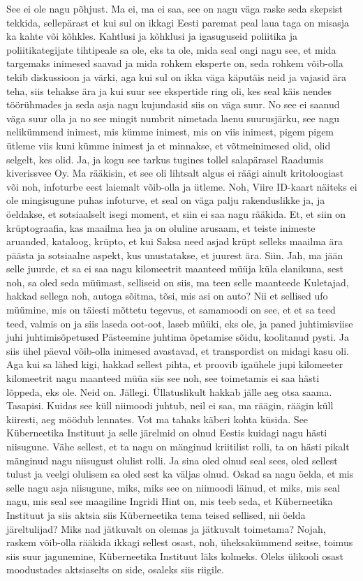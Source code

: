 See ei ole nagu põhjust. Ma ei, ma ei saa, see on nagu väga raske seda skepsist tekkida, sellepärast et kui sul on ikkagi Eesti paremat peal laua taga on misasja ka kahte või kõhkles.
Kahtlusi ja kõhklusi ja igasuguseid poliitika ja poliitikategijate tihtipeale sa ole, eks ta ole, mida seal ongi nagu see, et mida targemaks inimesed saavad ja mida rohkem eksperte on, seda rohkem võib-olla tekib diskussioon ja värki, aga kui sul on ikka väga käputäis neid ja vajasid ära teha, siis tehakse ära ja kui suur see ekspertide ring oli, kes seal käis nendes töörühmades ja seda asja nagu kujundasid siis on väga suur. No see ei saanud väga suur olla ja no see mingit numbrit nimetada laenu suurusjärku, see nagu nelikümmend inimest, mis kümme inimest, mis on viis inimest, pigem pigem ütleme viis kuni kümme inimest ja et minnakse, et võtmeinimesed olid, olid selgelt, kes olid. Ja, ja kogu see tarkus tugines tollel salapärasel Raadumis kiverissvee Oy. Ma rääkisin, et see oli lihtsalt algus ei räägi ainult kritoloogiast või noh, infoturbe eest laiemalt võib-olla ja ütleme. Noh, Viire ID-kaart näiteks ei ole mingisugune puhas infoturve, et seal on väga palju rakenduslikke ja, ja öeldakse, et sotsiaalselt isegi moment, et siin ei saa nagu rääkida. Et, et siin on krüptograafia, kas maailma hea ja on oluline arusaam, et teiste inimeste aruanded, kataloog, krüpto, et kui Saksa need asjad krüpt selleks maailma ära päästa ja sotsiaalne aspekt, kus unustatakse, et juurest ära. Siin. Jah, ma jään selle juurde, et sa ei saa nagu kilomeetrit maanteed müüja küla elanikuna, sest noh, sa oled seda müümast, selliseid on siis, ma teen selle maanteede Kuletajad, hakkad sellega noh, autoga sõitma, tõsi, mis asi on auto?
Nii et sellised ufo müümine, mis on täiesti mõttetu tegevus, et samamoodi on see, et et sa teed teed, valmis on ja siis laseda oot-oot, laseb müüki, eks ole, ja paned juhtimisviise juhi juhtimisõpetused Pästeemine juhtima õpetamise sõidu, koolitanud pysti. Ja siis ühel päeval võib-olla inimesed avastavad, et transpordist on midagi kasu oli. Aga kui sa lähed kigi, hakkad sellest pihta, et proovib igaühele jupi kilomeeter kilomeetrit nagu maanteed müüa siis see noh, see toimetamis ei saa hästi lõppeda, eks ole. Neid on.
Jällegi.
Üllatuslikult hakkab jälle aeg otsa saama. Tasapisi. Kuidas see küll niimoodi juhtub, neil ei saa, ma räägin, räägin küll kiiresti, aeg möödub lennates.
Vot ma tahaks käberi kohta küsida. See Küberneetika Instituut ja selle järelmid on olnud Eestis kuidagi nagu hästi niisugune. Vähe sellest, et ta nagu on mänginud kriitilist rolli, ta on hästi pikalt mänginud nagu niisugust olulist rolli. Ja sina oled olnud seal sees, oled sellest tulust ja veelgi olulisem sa oled sest ka väljas olnud. Oskad sa nagu öelda, et mis selle nagu asja niisugune, miks, miks see on niimoodi läinud, et miks, mis seal nagu, mis seal see maagiline Ingridi Hint on, mis teeb seda, et Küberneetika Instituut ja siis aktsia siis Küberneetika tema teised sellised, nii öelda järeltulijad? Miks nad jätkuvalt on olemas ja jätkuvalt toimetama? Nojah, raskem võib-olla rääkida ikkagi sellest osast, noh, üheksakümmend seitse, toimus siis suur jagunemine, Küberneetika Instituut läks kolmeks. Oleks ülikooli osast moodustades aktsiaselts on side, osaleks siis riigile.
